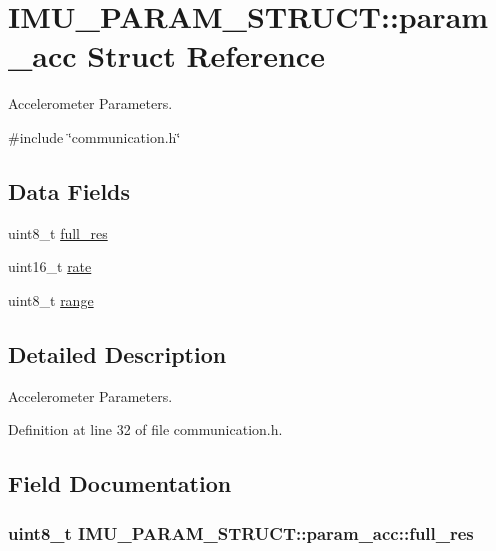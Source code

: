 \hypertarget{structIMU__PARAM__STRUCT_1_1param__acc}{\section{I\-M\-U\-\_\-\-P\-A\-R\-A\-M\-\_\-\-S\-T\-R\-U\-C\-T\-:\-:param\-\_\-acc Struct Reference}
\label{structIMU__PARAM__STRUCT_1_1param__acc}
}


Accelerometer Parameters.  




{\ttfamily \#include \char`\"{}communication.\-h\char`\"{}}

\subsection*{Data Fields}
\begin{DoxyCompactItemize}
\item 
uint8\-\_\-t \hyperlink{structIMU__PARAM__STRUCT_1_1param__acc_af57da5d956ffa7e49a184326b6b9c738}{full\-\_\-res}
\item 
uint16\-\_\-t \hyperlink{structIMU__PARAM__STRUCT_1_1param__acc_a30e6a318cad098cd8379416705820f95}{rate}
\item 
uint8\-\_\-t \hyperlink{structIMU__PARAM__STRUCT_1_1param__acc_a26199b298ef2d353192dfbc706bce8cf}{range}
\end{DoxyCompactItemize}


\subsection{Detailed Description}
Accelerometer Parameters. 

Definition at line 32 of file communication.\-h.



\subsection{Field Documentation}
\hypertarget{structIMU__PARAM__STRUCT_1_1param__acc_af57da5d956ffa7e49a184326b6b9c738}{
\subsubsection[{full\-\_\-res}]{\setlength{\rightskip}{0pt plus 5cm}uint8\-\_\-t I\-M\-U\-\_\-\-P\-A\-R\-A\-M\-\_\-\-S\-T\-R\-U\-C\-T\-::param\-\_\-acc\-::full\-\_\-res}}\label{structIMU__PARAM__STRUCT_1_1param__acc_af57da5d956ffa7e49a184326b6b9c738}


